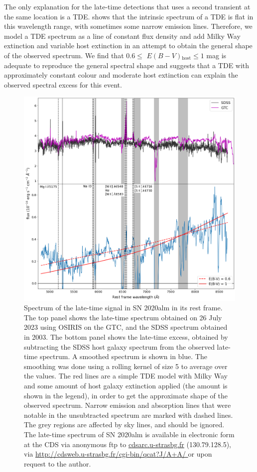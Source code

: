 \documentclass[a4paper,oneside,12pt, class=Latex/Classes/PhDthesisPSnPDF, crop=false]{standalone}
\begin{document}
The only explanation for the late-time detections that uses a second transient at the same location is a TDE. \citet{TDE_host_ext_range} shows that the intrinsic spectrum of a TDE is flat in this wavelength range, with sometimes some narrow emission lines. Therefore, we model a TDE spectrum as a line of constant flux density and add Milky Way extinction \citep[using the SFD89 dust maps in the direction of the object; ][]{SFD98_dust_maps} and variable host extinction in an attempt to obtain the general shape of the observed spectrum. We find that $0.6\leq$ $E(B - V)$$_\text{host}\leq1$ mag is adequate to reproduce the general spectral shape and suggests that a TDE with approximately constant colour and moderate host extinction can explain the observed spectral excess for this event.

\begin{figure}
 \centering
 \includegraphics[width=\textwidth]{../Images/chapter_3/spec_obj.png}
 \caption{Spectrum of the late-time signal in SN 2020alm in its rest frame. The top panel shows the late-time spectrum obtained on 26 July 2023 using OSIRIS on the GTC, and the SDSS spectrum obtained in 2003. The bottom panel shows the late-time excess, obtained by subtracting the SDSS host galaxy spectrum from the observed late-time spectrum. A smoothed spectrum is shown in blue. The smoothing was done using a rolling kernel of size 5 to average over the values. The red lines are a simple TDE model with Milky Way and some amount of host galaxy extinction applied (the amount is shown in the legend), in order to get the approximate shape of the observed spectrum. Narrow emission and absorption lines that were notable in the unsubtracted spectrum are marked with dashed lines. The grey regions are affected by sky lines, and should be ignored. The late-time spectrum of SN 2020alm is available in electronic form at the CDS via anonymous ftp to \url{cdsarc.u-strasbg.fr} (130.79.128.5), via \url{http://cdsweb.u-strasbg.fr/cgi-bin/qcat?J/A+A/ }or upon request to the author.}
 \label{ZTF20aaifyfx_spec}
\end{figure}
\end{document}
